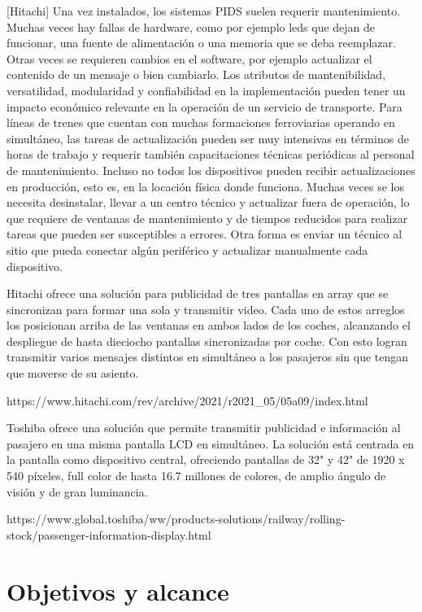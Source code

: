 [Hitachi] Una vez instalados, los sistemas PIDS suelen requerir mantenimiento. Muchas veces hay fallas de hardware, como por ejemplo leds que dejan de funcionar, una fuente de alimentación o una memoria que se deba reemplazar. Otras veces se requieren cambios en el software, por ejemplo actualizar el contenido de un mensaje o bien cambiarlo. Los atributos de mantenibilidad, versatilidad, modularidad y confiabilidad en la implementación pueden tener un impacto económico relevante en la operación de un servicio de transporte. Para líneas de trenes que cuentan con muchas formaciones ferroviarias operando en simultáneo, las tareas de actualización pueden ser muy intensivas en términos de horas de trabajo y requerir también capacitaciones técnicas periódicas al personal de mantenimiento. Incluso no todos los dispositivos pueden recibir actualizaciones en producción, esto es, en la locación física donde funciona. Muchas veces se los necesita desinstalar, llevar a un centro técnico y actualizar fuera de operación, lo que requiere de ventanas de mantenimiento y de tiempos reducidos para realizar tareas que pueden ser susceptibles a errores. Otra forma es enviar un técnico al sitio que pueda conectar algún periférico y actualizar manualmente cada dispositivo.

Hitachi ofrece una solución para publicidad de tres pantallas en array que se sincronizan para formar una sola y transmitir video. Cada uno de estos arreglos los posicionan arriba de las ventanas en ambos lados de los coches, alcanzando el despliegue de hasta dieciocho pantallas sincronizadas por coche. Con esto logran transmitir varios mensajes distintos en simultáneo a los pasajeros sin que tengan que moverse de su asiento.

https://www.hitachi.com/rev/archive/2021/r2021_05/05a09/index.html

Toshiba ofrece una solución que permite transmitir publicidad e información al pasajero en una misma pantalla LCD en simultáneo. La solución está centrada en la pantalla como dispositivo central, ofreciendo pantallas de 32" y 42" de 1920 x 540 píxeles, full color de hasta 16.7 millones de colores, de amplio ángulo de visión y de gran luminancia.

https://www.global.toshiba/ww/products-solutions/railway/rolling-stock/passenger-information-display.html

\pagebreak
\section{Objetivos y alcance}

